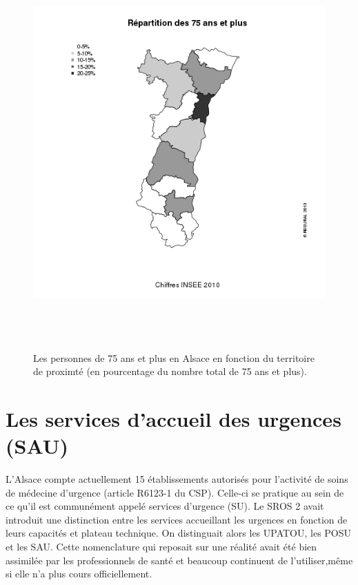 \documentclass[12pt,english,french,twoside]{report}\usepackage[]{graphicx}\usepackage[]{color}
\begin{document}
\begin{figure}[ht]
 \centering
 \includegraphics[height=15cm,keepaspectratio=true]{../figure/75ans.png}
 \caption[Répartition des 75 ans et plus]{Les personnes de 75 ans et plus en Alsace en fonction du territoire de proximté (en pourcentage du nombre total de 75 ans et plus).}
 \label{fig:75ans}
\end{figure}

\section{Les services d'accueil des urgences (SAU)}

L'Alsace compte actuellement 15 établissements autorisés pour l'activité de soins de médecine d'urgence (article R6123-1 du CSP). Celle-ci se pratique au sein de ce qu'il est communément appelé services d'urgence (SU). Le SROS 2 avait introduit une distinction entre les services accueillant les urgences en fonction de leurs capacités et plateau technique. On distinguait alors les UPATOU, les POSU et les SAU. Cette nomenclature qui reposait sur une réalité avait été bien assimilée par les professionnels de santé et beaucoup continuent de l'utiliser,même si elle n'a plus cours officiellement. 
\end{document}
